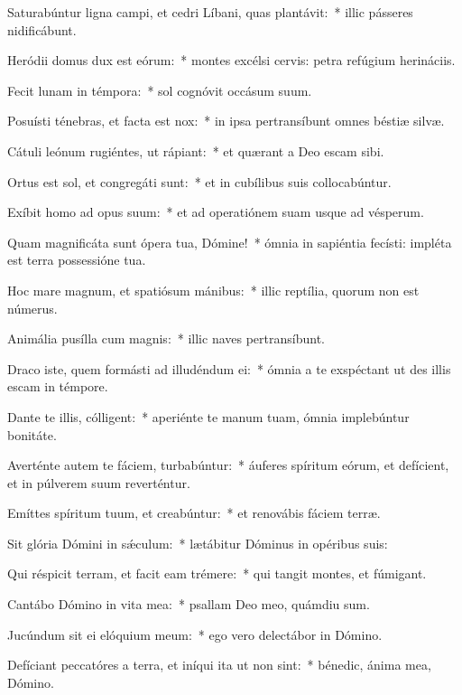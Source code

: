 \item Saturabúntur ligna campi, et cedri Líbani, quas plantávit:~* illic pásseres nidificábunt.

\item Heródii domus dux est eórum:~* montes excélsi cervis: petra refúgium herináciis.

\item Fecit lunam in témpora:~* sol cognóvit occásum suum.

\item Posuísti ténebras, et facta est nox:~* in ipsa pertransíbunt omnes béstiæ silvæ.

\item Cátuli leónum rugiéntes, ut rápiant:~* et quærant a Deo escam sibi.

\item Ortus est sol, et congregáti sunt:~* et in cubílibus suis collocabúntur.

\item Exíbit homo ad opus suum:~* et ad operatiónem suam usque ad vésperum.

\item Quam magnificáta sunt ópera tua, Dómine!~* ómnia in sapiéntia fecísti: impléta est terra possessióne tua.

\item Hoc mare magnum, et spatiósum mánibus:~* illic reptília, quorum non est númerus.

\item Animália pusílla cum magnis:~* illic naves pertransíbunt.

\item Draco iste, quem formásti ad illudéndum ei:~* ómnia a te exspéctant ut des illis escam in témpore.

\item Dante te illis, cólligent:~* aperiénte te manum tuam, ómnia implebúntur bonitáte.

\item Averténte autem te fáciem, turbabúntur:~* áuferes spíritum eórum, et defícient, et in púlverem suum reverténtur.

\item Emíttes spíritum tuum, et creabúntur:~* et renovábis fáciem terræ.

\item Sit glória Dómini in sǽculum:~* lætábitur Dóminus in opéribus suis:

\item Qui réspicit terram, et facit eam trémere:~* qui tangit montes, et fúmigant.

\item Cantábo Dómino in vita mea:~* psallam Deo meo, quámdiu sum.

\item Jucúndum sit ei elóquium meum:~* ego vero delectábor in Dómino.

\item Defíciant peccatóres a terra, et iníqui ita ut non sint:~* bénedic, ánima mea, Dómino.
